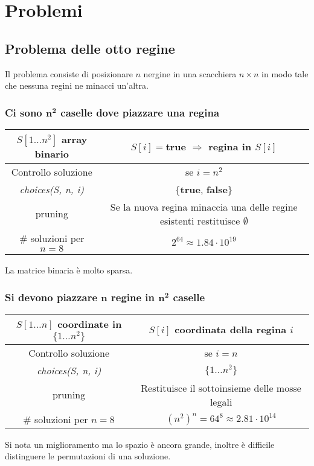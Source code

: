 \section{Problemi}
\subsection{Problema delle otto regine}
Il problema consiste di posizionare $n$ nergine in una scacchiera $n\times n$ in modo tale che nessuna regini ne minacci un'altra.
\subsubsection{Ci sono $\mathbf{n^2}$ caselle dove piazzare una regina}
\begin{tabular}{|c|c|}
	\hline
	$S[1\dots n^2]$ array binario & $S[i]=$\textbf{true} $\Rightarrow$ regina in $S[i]$ \\
	\hline
	Controllo soluzione & se $i = n^2$ \\
	\hline
	\emph{choices(S, n, i)} & $\{$\textbf{true}, \textbf{false}$\}$\\
	\hline
	pruning & \makecell{Se la nuova regina minaccia una delle \\regine esistenti restituisce $\emptyset$}\\
	\hline
	$\#$ soluzioni per $n=8$ & $2^{64}\approx 1.84\cdot 10^{19}$\\
	\hline
\end{tabular}
La matrice binaria \`e molto sparsa.
\subsubsection{Si devono piazzare $\mathbf{n}$ regine in $\mathbf{n^2}$ caselle}
\begin{tabular}{|c|c|}
	\hline
	$S[1\dots n]$ coordinate in $\{1\dots n^2\}$ & $S[i]$ coordinata della regina $i$\\
	\hline
	Controllo soluzione & se $i = n$ \\
	\hline
	\emph{choices(S, n, i)} & $\{1\dots n^2\}$\\
	\hline
	pruning & Restituisce il sottoinsieme delle mosse legali\\
	\hline
	$\#$ soluzioni per $n=8$ & $(n^2)^n = 64^{8}\approx 2.81\cdot 10^{14}$\\
	\hline
\end{tabular}
Si nota un miglioramento ma lo spazio \`e ancora grande, inoltre \`e difficile distinguere le permutazioni di una soluzione.
